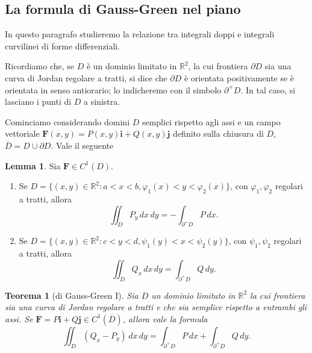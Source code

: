 \documentclass[a4paper]{book}
\numberwithin{equation}{section}
\renewcommand{\phi}{\varphi}
\theoremstyle{plain}
\newtheorem{teor}{Teorema}[section]
\theoremstyle{definition}
\newtheorem{lem}{Lemma}[section]
\theoremstyle{remark}
\renewcommand{\vec}{\boldsymbol}
\theoremstyle{example}
\begin{document}
	\subsection{La formula di Gauss-Green nel piano}

	In questo paragrafo studieremo la relazione tra integrali doppi e integrali curvilinei di forme differenziali.

	Ricordiamo che, se $D$ è un dominio limitato in $\mathbb{R}^2$, la cui frontiera $\partial D$ sia una curva di Jordan regolare a tratti, si dice che $\partial D$ è orientata positivamente se è orientata in senso antiorario; lo indicheremo con il simbolo $\partial^+ D$. In tal caso, si lasciano i punti di $D$ a sinistra.

	Cominciamo considerando domini $D$ semplici rispetto agli assi e un campo vettoriale $\vec{F}(x, y) = P(x, y) \vec{i} + Q(x, y)\vec{j}$ definito sulla chiusura di $D$, $\overline{D} = D \cup \partial D$. Vale il seguente
	\begin{lem}
		Sia $\vec{F} \in C^1(D)$.
		\begin{enumerate}
			\item Se $D = \{ (x, y) \in \mathbb{R}^2 \colon a < x < b, \phi_1(x) < y < \phi_2(x) \}$, con $\phi_1, \phi_2$ regolari a tratti, allora
			\begin{equation}
				\iint_D P_y \, dx \, dy = - \int_{\partial^+ D} P \, dx.
			\end{equation}

			\item Se $D = \{ (x, y) \in \mathbb{R}^2 \colon c < y < d, \psi_1(y) < x < \psi_2(y) \}$, con $\psi_1, \psi_2$ regolari a tratti, allora
			\begin{equation}
				\iint_D Q_x \, dx \, dy = \int_{\partial^+ D} Q \, dy.
			\end{equation}
		\end{enumerate}
	\end{lem}

	\begin{teor}[di Gauss-Green I]
		\label{gaussgreen1}
		Sia $D$ un dominio limitato in $\mathbb{R}^2$ la cui frontiera sia una curva di Jordan regolare a tratti e che sia semplice rispetto a entrambi gli assi. Se $\vec{F} = P\vec{i} + Q\vec{j} \in C^1(\overline{D})$, allora vale la formula
		\begin{equation}
			\label{eqn:gaussgreen1}
			\iint_D (Q_x - P_y) \, dx \, dy  = \int_{\partial^+ D} P \, dx + \int_{\partial^+ D} Q \, dy.
		\end{equation}
	\end{teor}
\end{document}
